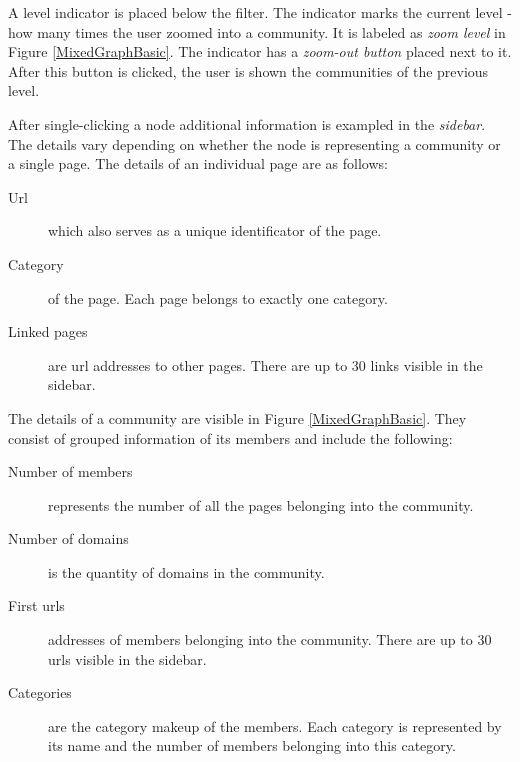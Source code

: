 A level indicator is placed below the filter. The indicator marks the current level - how many times the user zoomed into a community. It is labeled as \textit{zoom level} in Figure \ref{MixedGraphBasic}. The indicator has a \textit{zoom-out button} placed next to it. After this button is clicked, the user is shown the communities of the previous level.

After single-clicking a node additional information is exampled in the \textit{sidebar}. The details vary depending on whether the node is representing a community or a single page.
The details of an individual page are as follows: 
\begin {description}
	\item [Url] which also serves as a unique identificator of the page. 
	\item [Category] of the page. Each page belongs to exactly one category.
	\item[Linked pages] are url addresses to other pages. There are up to 30 links visible in the sidebar. 
\end{description}

The details of a community are visible in Figure \ref{MixedGraphBasic}. They consist of grouped information of its members and include the following:
\begin {description}
	\item[Number of members] represents the number of all the pages belonging into the community. 
	\item [Number of domains] is the quantity of domains in the community.
	\item [First urls] addresses of members belonging into the community. There are up to 30 urls visible in the sidebar. 
	\item [Categories] are the category makeup of the members. Each category is represented by its name and the number of members belonging into this category.
\end{description}

